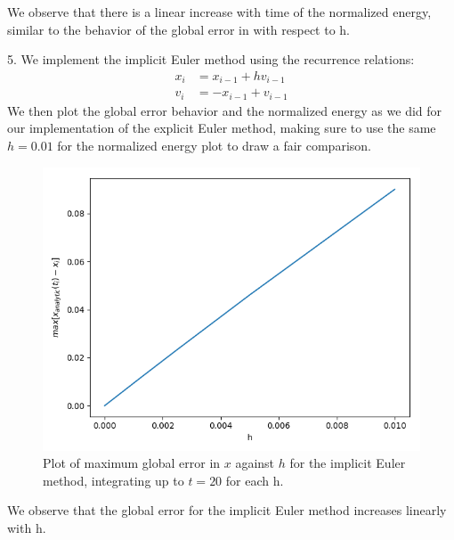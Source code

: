 \documentclass[11pt]{article}
\begin{document}
We observe that there is a linear increase with time of the normalized energy, similar to the behavior of the global error in with respect to h.

5. We implement the implicit Euler method using the recurrence relations:
\begin{align*}
x_i &= x_{i-1}+hv_{i-1} \\
v_i &= -x_{i-1}+v_{i-1}
\end{align*}
We then plot the global error behavior and the normalized energy as we did for our implementation of the explicit Euler method, making sure to use the same $h=0.01$ for the normalized energy plot to draw a fair comparison.
\newpage
\begin{figure}[htp]
\centering
\includegraphics[scale=0.70]{implicit_err_behavior.png}
\caption{Plot of maximum global error in $x$ against $h$ for the implicit Euler method, integrating up to $t=20$ for each h.}
\label{impliciterr}
\end{figure}
We observe that the global error for the implicit Euler method increases linearly with h.
\newpage
\end{document}
